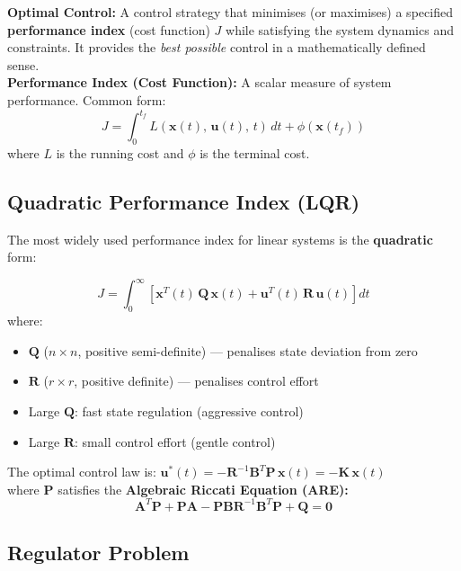 \documentclass[12pt,a4paper]{article}
\begin{document}
\begin{tcolorbox}[defbox]
\textbf{Optimal Control:} A control strategy that minimises (or maximises) a specified \textbf{performance index} (cost function) $J$ while satisfying the system dynamics and constraints. It provides the \textit{best possible} control in a mathematically defined sense.\\[4pt]
\textbf{Performance Index (Cost Function):} A scalar measure of system performance. Common form:
$$J = \int_0^{t_f} L(\mathbf{x}(t),\, \mathbf{u}(t),\, t)\, dt + \phi(\mathbf{x}(t_f))$$
where $L$ is the running cost and $\phi$ is the terminal cost.
\end{tcolorbox}

\subsection{Quadratic Performance Index (LQR)}

The most widely used performance index for linear systems is the \textbf{quadratic} form:

\begin{tcolorbox}[formulabox, title={Quadratic Performance Index}]
$$J = \int_0^{\infty} \left[\mathbf{x}^T(t)\,\mathbf{Q}\,\mathbf{x}(t) + \mathbf{u}^T(t)\,\mathbf{R}\,\mathbf{u}(t)\right] dt$$
where:
\begin{itemize}[leftmargin=*, itemsep=2pt, topsep=2pt]
  \item $\mathbf{Q}$ ($n\times n$, positive semi-definite) --- penalises state deviation from zero
  \item $\mathbf{R}$ ($r\times r$, positive definite) --- penalises control effort
  \item Large $\mathbf{Q}$: fast state regulation (aggressive control)
  \item Large $\mathbf{R}$: small control effort (gentle control)
\end{itemize}
The optimal control law is: $\mathbf{u}^*(t) = -\mathbf{R}^{-1}\mathbf{B}^T\mathbf{P}\,\mathbf{x}(t) = -\mathbf{K}\,\mathbf{x}(t)$\\
where $\mathbf{P}$ satisfies the \textbf{Algebraic Riccati Equation (ARE):}
$$\mathbf{A}^T\mathbf{P} + \mathbf{P}\mathbf{A} - \mathbf{P}\mathbf{B}\mathbf{R}^{-1}\mathbf{B}^T\mathbf{P} + \mathbf{Q} = \mathbf{0}$$
\end{tcolorbox}

\subsection{Regulator Problem}
\end{document}
